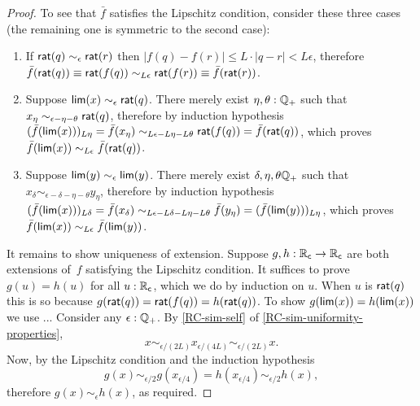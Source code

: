 \begin{proof}
  To see that $\bar{f}$ satisfies the Lipschitz condition, consider these three cases (the
  remaining one is symmetric to the second case):
  \begin{enumerate}
  \item If $\mathsf{rat}(q) \sim_\epsilon \mathsf{rat}(r)$ then $|f(q) - f(r)| \leq L \cdot |q - r| <
    L \epsilon$, therefore $\bar{f}(\mathsf{rat}(q)) \equiv \mathsf{rat}(f(q)) \sim_{L \epsilon}
    \mathsf{rat}(f(r)) \equiv \bar{f}(\mathsf{rat}(r))$.
  \item Suppose $\mathsf{lim}(x) \sim_\epsilon \mathsf{rat}(q)$. There merely exist $\eta, \theta :
    \mathbb{Q}_{+}$ such that $x_\eta \sim_{\epsilon - \eta - \theta} \mathsf{rat}(q)$, therefore by
    induction hypothesis $(\bar{f}(\mathsf{lim}(x)))_{L \eta} = \bar{f}(x_\eta) \sim_{L \epsilon - L
      \eta - L \theta} \mathsf{rat}(f(q)) = \bar{f}(\mathsf{rat}(q))$, which proves
    $\bar{f}(\mathsf{lim}(x)) \sim_{L \epsilon} \bar{f}(\mathsf{rat}(q))$.
  \item Suppose $\mathsf{lim}(y) \sim_\epsilon \mathsf{lim}(y)$. There merely exist $\delta, \eta,
    \theta \mathbb{Q}_{+}$ such that $x_\delta \sim_{\epsilon - \delta - \eta - \theta} y_\eta$,
    therefore by induction hypothesis $(\bar{f}(\mathsf{lim}(x)))_{L \delta} = \bar{f}(x_\delta)
    \sim_{L \epsilon - L \delta - L \eta - L \theta} \bar{f}(y_\eta) =
    (\bar{f}(\mathsf{lim}(y)))_{L \eta}$, which proves $\bar{f}(\mathsf{lim}(x)) \sim_{L \epsilon}
    \bar{f}(\mathsf{lim}(y))$. 
  \end{enumerate}

  It remains to show uniqueness of extension. Suppose $g, h : \mathbb{R}_\mathsf{c} \to \mathbb{R}_\mathsf{c}$ are both
  extensions of~$f$ satisfying the Lipschitz condition. It suffices to prove $g(u) = h(u)$
  for all $u : \mathbb{R}_\mathsf{c}$, which we do by induction on $u$. When $u$ is $\mathsf{rat}(q)$ this is so
  because $g(\mathsf{rat}(q)) = \mathsf{rat}(f(q)) = h(\mathsf{rat}(q))$. To show $g(\mathsf{lim}(x)) =
  h(\mathsf{lim}(x))$ we use ... Consider any $\epsilon : \mathbb{Q}_{+}$. By \autoref{RC-sim-self} of
  \autoref{RC-sim-uniformity-properties},
  \begin{equation*}
    x \sim_{\epsilon/(2 L)}
    x_{\epsilon/(4 L)} \sim_{\epsilon/(2 L)}
    x.
  \end{equation*}
  Now, by the Lipschitz condition and the induction hypothesis
  \begin{equation*}
    g(x) \sim_{\epsilon/2}
    g(x_{\epsilon/4}) =
    h(x_{\epsilon/4}) \sim_{\epsilon/2}
    h(x),
  \end{equation*}
  therefore $g(x) \sim_\epsilon h(x)$, as required.
\end{proof}



